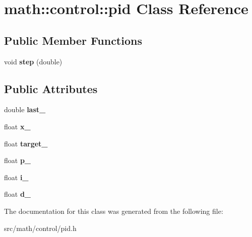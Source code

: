 \hypertarget{classmath_1_1control_1_1pid}{
\section{math::control::pid Class Reference}
\label{classmath_1_1control_1_1pid}
}
\subsection*{Public Member Functions}
\begin{DoxyCompactItemize}
\item 
\hypertarget{classmath_1_1control_1_1pid_a84b6cc9e830497f97379f23ec47cec78}{
void {\bfseries step} (double)}
\label{classmath_1_1control_1_1pid_a84b6cc9e830497f97379f23ec47cec78}

\end{DoxyCompactItemize}
\subsection*{Public Attributes}
\begin{DoxyCompactItemize}
\item 
\hypertarget{classmath_1_1control_1_1pid_af3422f9458a3808cf27e476a9d3ea7f8}{
double {\bfseries last\_\-}}
\label{classmath_1_1control_1_1pid_af3422f9458a3808cf27e476a9d3ea7f8}

\item 
\hypertarget{classmath_1_1control_1_1pid_a96bd72165f8a76f59e52160ba45b8a34}{
float {\bfseries x\_\-}}
\label{classmath_1_1control_1_1pid_a96bd72165f8a76f59e52160ba45b8a34}

\item 
\hypertarget{classmath_1_1control_1_1pid_a0dfc23d87634ed8d670675f25227fa83}{
float {\bfseries target\_\-}}
\label{classmath_1_1control_1_1pid_a0dfc23d87634ed8d670675f25227fa83}

\item 
\hypertarget{classmath_1_1control_1_1pid_af64925e1179ec6e423f52383ffb9c86e}{
float {\bfseries p\_\-}}
\label{classmath_1_1control_1_1pid_af64925e1179ec6e423f52383ffb9c86e}

\item 
\hypertarget{classmath_1_1control_1_1pid_ab7dead63e018c136c4cae6ae74a4f8df}{
float {\bfseries i\_\-}}
\label{classmath_1_1control_1_1pid_ab7dead63e018c136c4cae6ae74a4f8df}

\item 
\hypertarget{classmath_1_1control_1_1pid_a1fd5c5d1f63a2822887ab9606223ded0}{
float {\bfseries d\_\-}}
\label{classmath_1_1control_1_1pid_a1fd5c5d1f63a2822887ab9606223ded0}

\end{DoxyCompactItemize}


The documentation for this class was generated from the following file:\begin{DoxyCompactItemize}
\item 
src/math/control/pid.h\end{DoxyCompactItemize}
